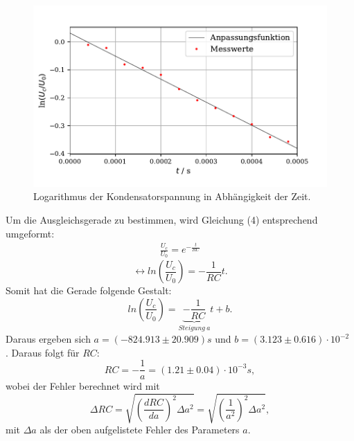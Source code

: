 \begin{figure}
  \centering
  \includegraphics{plot1.pdf}
  \caption{Logarithmus der Kondensatorspannung in Abhängigkeit der Zeit.}
  \label{fig:plot}
\end{figure}
\noindent Um die Ausgleichsgerade zu bestimmen, wird Gleichung (4) entsprechend umgeformt:
\begin{align*}
    \frac{U_c}{U_0} = e^{-\frac{t}{RC}}
\end{align*}
\begin{equation*}
    \leftrightarrow ln{(\frac{U_c}{U_0})} = -\frac{1}{RC}t .
\end{equation*}
Somit hat die Gerade folgende Gestalt:
\begin{equation}
    ln{(\frac{U_c}{U_0})} = \underbrace{-\frac{1}{RC}}_{Steigung \: a}t + b .
\end{equation}
Daraus ergeben sich $a = (-824.913 \pm 20.909)s$ und $b = (3.123 \pm 0.616) \cdot 10^{-2} $ .
Daraus folgt für $RC$:
\begin{equation*}
    RC = -\frac{1}{a} = (1.21 \pm 0.04)\cdot 10^{-3} s , 
\end{equation*}
wobei der Fehler berechnet wird mit
\begin{equation*}
   \Delta RC = \sqrt{(\frac{dRC}{da})^2\Delta a^2} = \sqrt{(\frac{1}{a^2})^2 \Delta a^2} ,
\end{equation*}
mit $\Delta a$ als der oben aufgelistete Fehler des Parameters $a$.


